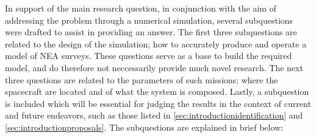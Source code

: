 In support of the main research question, in conjunction with the aim of addressing the problem through a numerical simulation, several subquestions were drafted to assist in providing an answer. The first three subquestions are related to the design of the simulation; how to accurately produce and operate a model of NEA surveys. These questions serve as a base to build the required model, and do therefore not neccessarily provide much novel research. The next three questions are related to the parameters of such missions; where the spacecraft are located and of what the system is composed. Lastly, a subquestion is included which will be essential for judging the results in the context of current and future endeavors, such as those listed in \autoref{sec:introductionidentification} and \autoref{sec:introductionproposals}. The subquestions are explained in brief below:
